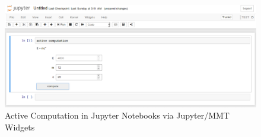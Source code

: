   \begin{figure}[ht]\centering
    \includegraphics[width=12cm]{activecomp}
    \caption{Active Computation in Jupyter Notebooks via Jupyter/MMT Widgets}\label{fig:ac}
  \end{figure}


